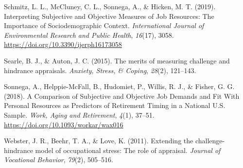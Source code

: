 \documentclass[
  man]{apa6}
\newlength{\cslhangindent}
\newlength{\cslentryspacingunit} %
\newenvironment{CSLReferences}[2] %
 {%
  \setlength{\parindent}{0pt}
  \ifodd #1
  \let\oldpar\par
  \def\par{\hangindent=\cslhangindent\oldpar}
  \fi
  \setlength{\parskip}{#2\cslentryspacingunit}
 }%
 {}
\begin{document}
\begin{CSLReferences}{1}{0}
\leavevmode{}%
Schmitz, L. L., McCluney, C. L., Sonnega, A., \& Hicken, M. T. (2019). Interpreting {Subjective} and {Objective} {Measures} of {Job} {Resources}: {The} {Importance} of {Sociodemographic} {Context}. \emph{International Journal of Environmental Research and Public Health}, \emph{16}(17), 3058. \url{https://doi.org/10.3390/ijerph16173058}

\leavevmode{}%
Searle, B. J., \& Auton, J. C. (2015). The merits of measuring challenge and hindrance appraisals. \emph{Anxiety, Stress, \& Coping}, \emph{28}(2), 121--143.

\leavevmode{}%
Sonnega, A., Helppie-McFall, B., Hudomiet, P., Willis, R. J., \& Fisher, G. G. (2018). A {Comparison} of {Subjective} and {Objective} {Job} {Demands} and {Fit} {With} {Personal} {Resources} as {Predictors} of {Retirement} {Timing} in a {National} {U}.{S}. {Sample}. \emph{Work, Aging and Retirement}, \emph{4}(1), 37--51. \url{https://doi.org/10.1093/workar/wax016}

\leavevmode{}%
Webster, J. R., Beehr, T. A., \& Love, K. (2011). Extending the challenge-hindrance model of occupational stress: The role of appraisal. \emph{Journal of Vocational Behavior}, \emph{79}(2), 505--516.

\end{CSLReferences}

\endgroup
\end{document}
